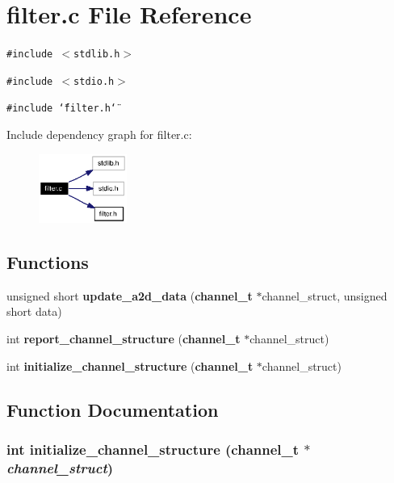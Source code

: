 \section{filter.c File Reference}
\label{filter_8c}
{\tt \#include $<$stdlib.h$>$}\par
{\tt \#include $<$stdio.h$>$}\par
{\tt \#include \char`\"{}filter.h\char`\"{}}\par


Include dependency graph for filter.c:\begin{figure}[H]
\begin{center}
\leavevmode
\includegraphics[width=82pt]{filter_8c__incl}
\end{center}
\end{figure}
\subsection*{Functions}
\begin{CompactItemize}
\item 
unsigned short {\bf update\_\-a2d\_\-data} ({\bf channel\_\-t} $\ast$channel\_\-struct, unsigned short data)
\item 
int {\bf report\_\-channel\_\-structure} ({\bf channel\_\-t} $\ast$channel\_\-struct)
\item 
int {\bf initialize\_\-channel\_\-structure} ({\bf channel\_\-t} $\ast$channel\_\-struct)
\end{CompactItemize}


\subsection{Function Documentation}
\subsubsection{\setlength{\rightskip}{0pt plus 5cm}int initialize\_\-channel\_\-structure ({\bf channel\_\-t} $\ast$ {\em channel\_\-struct})}\label{filter_8c_a2}





